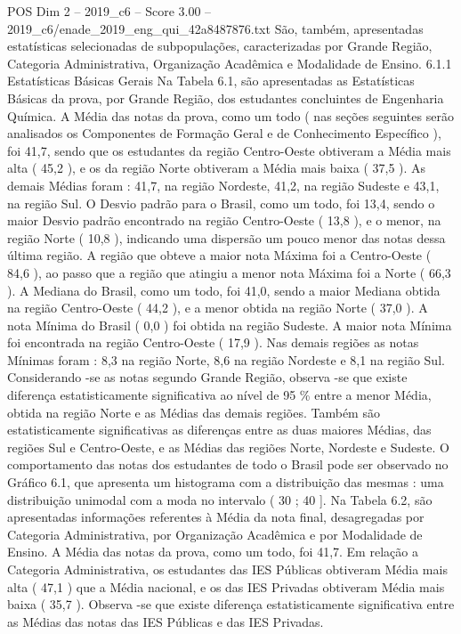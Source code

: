 \begin{textsample}{POS Dim 2 – 2019\_c6 – Score 3.00 – 2019\_c6/enade\_2019\_eng\_qui\_42a8487876.txt}
São, também, apresentadas estatísticas selecionadas de subpopulações, caracterizadas por Grande Região, Categoria Administrativa, Organização Acadêmica e Modalidade de Ensino. 6.1.1 Estatísticas Básicas Gerais Na Tabela 6.1, são apresentadas as Estatísticas Básicas da prova, por Grande Região, dos estudantes concluintes de Engenharia Química.
A Média das notas da prova, como um todo ( nas seções seguintes serão analisados os Componentes de Formação Geral e de Conhecimento Específico ), foi 41,7, sendo que os estudantes da região Centro-Oeste obtiveram a Média mais alta ( 45,2 ), e os da região Norte obtiveram a Média mais baixa ( 37,5 ).
As demais Médias foram : 41,7, na região Nordeste, 41,2, na região Sudeste e 43,1, na região Sul.
O Desvio padrão para o Brasil, como um todo, foi 13,4, sendo o maior Desvio padrão encontrado na região Centro-Oeste ( 13,8 ), e o menor, na região Norte ( 10,8 ), indicando uma dispersão um pouco menor das notas dessa última região.
A região que obteve a maior nota Máxima foi a Centro-Oeste ( 84,6 ), ao passo que a região que atingiu a menor nota Máxima foi a Norte ( 66,3 ).
A Mediana do Brasil, como um todo, foi 41,0, sendo a maior Mediana obtida na região Centro-Oeste ( 44,2 ), e a menor obtida na região Norte ( 37,0 ).
A nota Mínima do Brasil ( 0,0 ) foi obtida na região Sudeste.
A maior nota Mínima foi encontrada na região Centro-Oeste ( 17,9 ).
Nas demais regiões as notas Mínimas foram : 8,3 na região Norte, 8,6 na região Nordeste e 8,1 na região Sul.
Considerando -se as notas segundo Grande Região, observa -se que existe diferença estatisticamente significativa ao nível de 95 \% entre a menor Média, obtida na região Norte e as Médias das demais regiões.
Também são estatisticamente significativas as diferenças entre as duas maiores Médias, das regiões Sul e Centro-Oeste, e as Médias das regiões Norte, Nordeste e Sudeste.
O comportamento das notas dos estudantes de todo o Brasil pode ser observado no Gráfico 6.1, que apresenta um histograma com a distribuição das mesmas : uma distribuição unimodal com a moda no intervalo ( 30 ; 40 ].
Na Tabela 6.2, são apresentadas informações referentes à Média da nota final, desagregadas por Categoria Administrativa, por Organização Acadêmica e por Modalidade de Ensino.
A Média das notas da prova, como um todo, foi 41,7.
Em relação a Categoria Administrativa, os estudantes das IES Públicas obtiveram Média mais alta ( 47,1 ) que a Média nacional, e os das IES Privadas obtiveram Média mais baixa ( 35,7 ).
Observa -se que existe diferença estatisticamente significativa entre as Médias das notas das IES Públicas e das IES Privadas.

\end{textsample}
